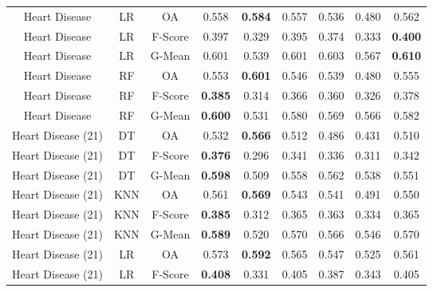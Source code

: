 \begin{longtable}{ccccccccc}
     Heart Disease &         LR &      OA &          0.558 & \textbf{0.584} &          0.557 &          0.536 &          0.480 &          0.562 \\
     Heart Disease &         LR & F-Score &          0.397 &          0.329 &          0.395 &          0.374 &          0.333 & \textbf{0.400} \\
     Heart Disease &         LR &  G-Mean &          0.601 &          0.539 &          0.601 &          0.603 &          0.567 & \textbf{0.610} \\
     Heart Disease &         RF &      OA &          0.553 & \textbf{0.601} &          0.546 &          0.539 &          0.480 &          0.555 \\
     Heart Disease &         RF & F-Score & \textbf{0.385} &          0.314 &          0.366 &          0.360 &          0.326 &          0.378 \\
     Heart Disease &         RF &  G-Mean & \textbf{0.600} &          0.531 &          0.580 &          0.569 &          0.566 &          0.582 \\
Heart Disease (21) &         DT &      OA &          0.532 & \textbf{0.566} &          0.512 &          0.486 &          0.431 &          0.510 \\
Heart Disease (21) &         DT & F-Score & \textbf{0.376} &          0.296 &          0.341 &          0.336 &          0.311 &          0.342 \\
Heart Disease (21) &         DT &  G-Mean & \textbf{0.598} &          0.509 &          0.558 &          0.562 &          0.538 &          0.551 \\
Heart Disease (21) &        KNN &      OA &          0.561 & \textbf{0.569} &          0.543 &          0.541 &          0.491 &          0.550 \\
Heart Disease (21) &        KNN & F-Score & \textbf{0.385} &          0.312 &          0.365 &          0.363 &          0.334 &          0.365 \\
Heart Disease (21) &        KNN &  G-Mean & \textbf{0.589} &          0.520 &          0.570 &          0.566 &          0.546 &          0.570 \\
Heart Disease (21) &         LR &      OA &          0.573 & \textbf{0.592} &          0.565 &          0.547 &          0.525 &          0.561 \\
Heart Disease (21) &         LR & F-Score & \textbf{0.408} &          0.331 &          0.405 &          0.387 &          0.343 &          0.405 \\

\end{longtable}
